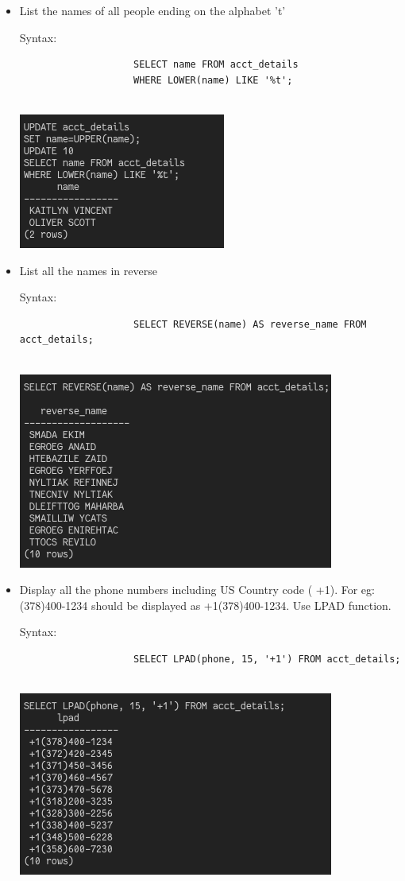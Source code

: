 \documentclass[13pt,oneside]{book}
\begin{document}
\begin{itemize}
					
					\item
					List the names of all people ending on the alphabet 't’
					 
					Syntax:
					\begin{verbatim}
					SELECT name FROM acct_details
					WHERE LOWER(name) LIKE '%t';
					
					\end{verbatim}
					\includegraphics[]{img/p6/ss8.png}
					
					
					\item
					List all the names in reverse
					 
					Syntax:
					\begin{verbatim}
					SELECT REVERSE(name) AS reverse_name FROM acct_details;
					
					\end{verbatim}
					\includegraphics[]{img/p6/ss9.png}
					
					
					\item
					Display all the phone numbers including US Country code ( +1). For eg:
					 (378)400-1234 should be displayed as +1(378)400-1234. Use LPAD function.
					 
					Syntax:
					\begin{verbatim}
					SELECT LPAD(phone, 15, '+1') FROM acct_details;
					
					\end{verbatim}
					\includegraphics[]{img/p6/ss10.png}
					

\end{itemize}
\end{document}
